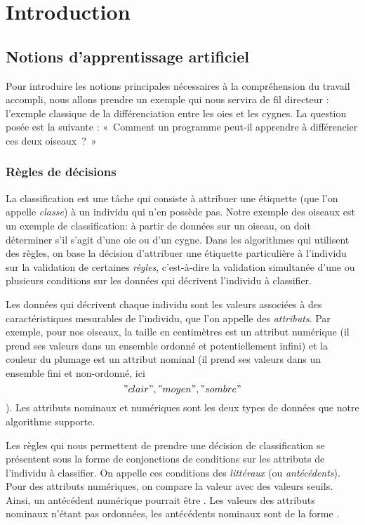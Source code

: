 \section{Introduction}

    \subsection{Notions d'apprentissage artificiel}

        Pour introduire les notions principales nécessaires à la compréhension du travail accompli, nous allons prendre un exemple qui nous servira de fil directeur : l’exemple classique de la différenciation entre les oies et les cygnes. La question posée est la suivante : «~Comment un programme peut-il apprendre à différencier ces deux oiseaux~?~»

        \subsubsection{Règles de décisions}

            La classification est une tâche qui consiste à attribuer une étiquette (que l'on appelle \emph{classe}) à un individu qui n'en possède pas. Notre exemple des oiseaux est un exemple de classification: à partir de données sur un oiseau, on doit déterminer s'il s'agit d'une oie ou d'un cygne. Dans les algorithmes qui utilisent des règles, on base la décision d'attribuer une étiquette particulière à l'individu sur la validation de certaines \emph{règles}, c'est-à-dire la validation simultanée d'une ou plusieurs conditions sur les données qui décrivent l'individu à classifier.

            Les données qui décrivent chaque individu sont les valeurs associées à des caractéristiques mesurables de l'individu, que l'on appelle des \emph{attributs}. Par exemple, pour nos oiseaux, la taille en centimètres est un attribut numérique (il prend ses valeurs dans un ensemble ordonné et potentiellement infini) et la couleur du plumage est un attribut nominal (il prend ses valeurs dans un ensemble fini et non-ordonné, ici \["clair", "moyen", "sombre"\]). Les attributs nominaux et numériques sont les deux types de données que notre algorithme supporte.

            Les règles qui nous permettent de prendre une décision de classification se présentent sous la forme de conjonctions de conditions sur les attributs de l'individu à classifier. On appelle ces conditions des \emph{littéraux} (ou \emph{antécédents}). Pour des attributs numériques, on compare la valeur avec des valeurs seuils. Ainsi, un antécédent numérique pourrait être . Les valeurs des attributs nominaux n'étant pas ordonnées, les antécédents nominaux sont de la forme .

